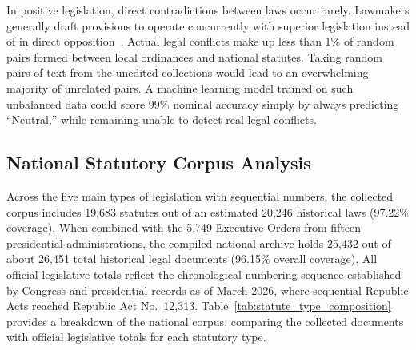         In positive legislation, direct contradictions between laws occur rarely. Lawmakers generally draft provisions to operate concurrently with superior legislation instead of in direct opposition~\cite{fuller1964the}. Actual legal conflicts make up less than 1\% of random pairs formed between local ordinances and national statutes. Taking random pairs of text from the unedited collections would lead to an overwhelming majority of unrelated pairs. A machine learning model trained on such unbalanced data could score 99\% nominal accuracy simply by always predicting ``Neutral,'' while remaining unable to detect real legal conflicts.

        \subsection{National Statutory Corpus Analysis}
        \label{sec:domain_categorization}
        Across the five main types of legislation with sequential numbers, the collected corpus includes 19,683 statutes out of an estimated 20,246 historical laws (97.22\% coverage). When combined with the 5,749 Executive Orders from fifteen presidential administrations, the compiled national archive holds 25,432 out of about 26,451 total historical legal documents (96.15\% overall coverage). All official legislative totals reflect the chronological numbering sequence established by Congress and presidential records as of March 2026, where sequential Republic Acts reached Republic Act No.~12,313. Table~\ref{tab:statute_type_composition} provides a breakdown of the national corpus, comparing the collected documents with official legislative totals for each statutory type.

